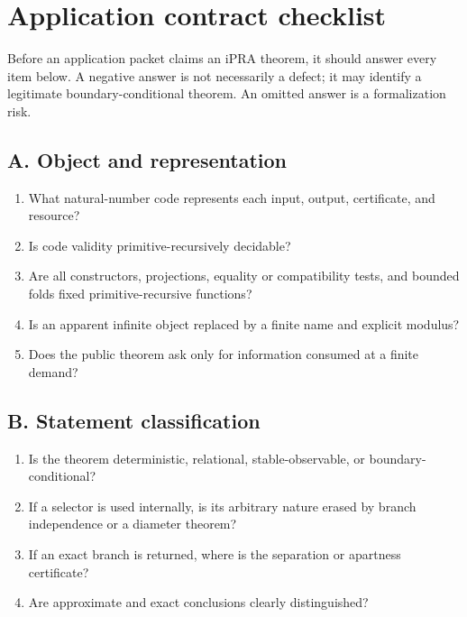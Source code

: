 \section{Application contract checklist}
\label{app:checklist}

Before an application packet claims an iPRA theorem, it should answer every item below.  A negative answer
is not necessarily a defect; it may identify a legitimate boundary-conditional theorem.  An omitted answer
is a formalization risk.

\subsection*{A. Object and representation}
\begin{enumerate}
  \item What natural-number code represents each input, output, certificate, and resource?
  \item Is code validity primitive-recursively decidable?
  \item Are all constructors, projections, equality or compatibility tests, and bounded folds fixed
        primitive-recursive functions?
  \item Is an apparent infinite object replaced by a finite name and explicit modulus?
  \item Does the public theorem ask only for information consumed at a finite demand?
\end{enumerate}

\subsection*{B. Statement classification}
\begin{enumerate}
  \item Is the theorem deterministic, relational, stable-observable, or boundary-conditional?
  \item If a selector is used internally, is its arbitrary nature erased by branch independence or a
        diameter theorem?
  \item If an exact branch is returned, where is the separation or apartness certificate?
  \item Are approximate and exact conclusions clearly distinguished?
\end{enumerate}

